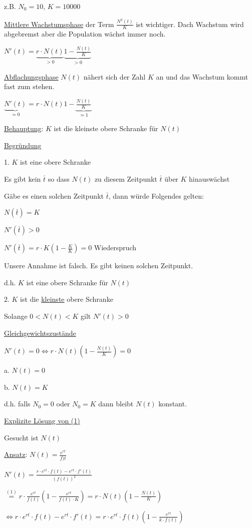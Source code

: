 \documentclass[18pt,a4paper]{scrreprt}
\begin{document}
z.B. $N_0 = 10$, $K = 10000$

\uline{Mittlere Wachstumsphase} der Term $\frac{N^2(t)}{K}$ ist wichtiger. Dach Wachstum wird abgebremst aber die Population wächst immer noch.

$N'(t) = \underbrace{r\cdot N(t)}_{>0} \underbrace{1-\frac{N(t)}{K}}_{>0}$

\uline{Abflachungsphase} $N(t)$ nähert sich der Zahl $K$ an und das Wachstum kommt fast zum stehen. 

$\underbrace{N'(t)}_{\simeq 0} = r\cdot N(t) 1-\underbrace{\frac{N(t)}{K}}_{\simeq 1}$ 

\uline{Behauptung}: $K$ ist die kleinste obere Schranke für $N(t)$

\uline{Begründung}

1. $K$ ist eine obere Schranke

Es gibt kein $\bar{t}$ so dass $N(t)$ zu diesem Zeitpunkt $\bar{t}$ über $K$ hinauswächst

Gäbe es einen solchen Zeitpunkt $\bar{t}$, dann würde Folgendes gelten:

$N(\bar{t}) = K$

$N'(\bar{t}) > 0$

$N'(\bar{t}) = r\cdot K (1-\frac{K}{K}) = 0$ Wiederspruch

Unsere Annahme ist falsch. Es gibt keinen solchen Zeitpunkt.

d.h. $K$ ist eine obere Schranke für $N(t)$

2. $K$ ist die \uline{kleinste} obere Schranke

Solange $0<N(t)<K$ gilt $N'(t)> 0$

\uline{Gleichgewichtszustände}

$N'(t) = 0 \Leftrightarrow r\cdot N(t) (1-\frac{N(t)}{K}) =0$

a. $N(t) = 0$

b. $N(t) = K$

d.h. falls $N_0 =0$ oder $N_0 = K$ dann bleibt $N(t)$ konstant.

\uline{Explizite Lösung von (1)}

Gesucht ist $N(t)$

\uline{Ansatz}: $N(t) = \frac{e^{rt}}{f)t}$

$N'(t) = \frac{r\cdot e^{rt}\cdot f(t) - e^{rt} \cdot f'(t)}{(f(t))^2}$

$\stackrel{(1)}{=} r\cdot \frac{e^{rt}}{f(t)}(1-\frac{e^{rt}}{f(t)\cdot K})=r\cdot N(t)(1-\frac{N(t)}{K})$

$\Leftrightarrow r\cdot e^{rt} \cdot f(t) - e^{rt} \cdot f'(t) = r\cdot e^{rt} \cdot f(t) (1-\frac{e^{rt}}{k\cdot f(t)})$
\end{document}

